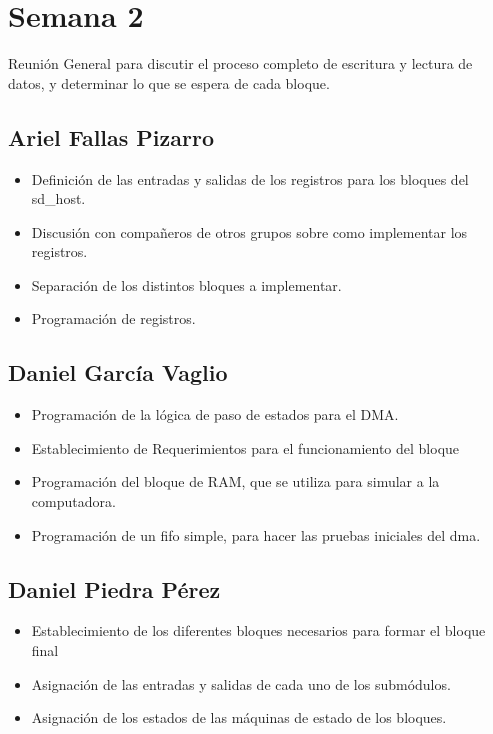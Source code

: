 \newpage
\section{Semana 2}

Reunión General para discutir el proceso completo de escritura y lectura de datos, y determinar lo
que se espera de cada bloque. 
\subsection{Ariel Fallas Pizarro}
\begin{itemize}
\item Definición de las entradas y salidas de los registros para los bloques del sd\_host.
\item Discusión con compañeros de otros grupos sobre como implementar los registros.
\item Separación de los distintos bloques a implementar.
\item Programación de registros.
\end{itemize}
\subsection{Daniel García Vaglio}
\begin{itemize}
\item Programación de la lógica de paso de estados para el DMA.
\item Establecimiento de Requerimientos para el funcionamiento del bloque
\item Programación del bloque de RAM, que se utiliza para simular a la computadora. 
\item Programación de un fifo simple, para hacer las pruebas iniciales del dma.
\end{itemize}


\subsection{Daniel Piedra Pérez}
\begin{itemize}
\item Establecimiento de los diferentes bloques necesarios para formar el bloque final
\item Asignación de las entradas y salidas de cada uno de los submódulos.
\item Asignación de los estados de las máquinas de estado de los bloques.
\end{itemize}

